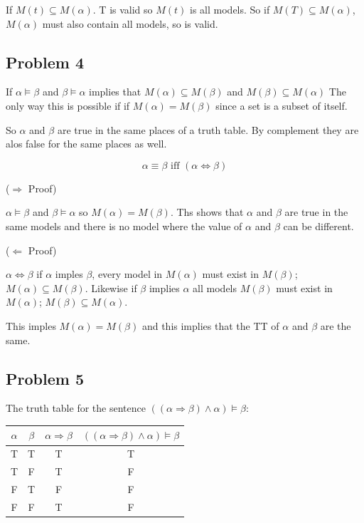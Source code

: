 \documentclass{article}
\begin{document}
If $M(t) \subseteq M( \alpha )$. T is valid so $M(t)$ is all models. So if $M(T) \subseteq M( \alpha )$, $M( \alpha )$ must also contain all models, so is valid.

\subsection{Problem 4}

If $ \alpha  \models  \beta $ and $ \beta  \models  \alpha $ implies that $M( \alpha ) \subseteq M( \beta )$ and $M( \beta ) \subseteq M( \alpha )$ The only way this is possible if if $M( \alpha )=M( \beta )$ since a set is a subset of itself.

So $ \alpha $ and $ \beta $ are true in the same places of a truth table. By complement they are alos false for the same places as well.

\[
 \alpha  \equiv  \beta  \text{ iff } ( \alpha  \Leftrightarrow  \beta )
\]

($\Rightarrow$ Proof)

$ \alpha  \models  \beta $ and $ \beta  \models  \alpha $ so $M( \alpha )=M( \beta )$. Ths shows that $ \alpha $ and $ \beta $ are true in the same models and there is no model where the value of $ \alpha $ and $ \beta $ can be different.

($\Leftarrow$ Proof)

$ \alpha  \Leftrightarrow  \beta $ if $ \alpha $ imples $ \beta $, every model in $M( \alpha )$ must exist in $M( \beta )$; $M( \alpha ) \subseteq M( \beta )$. Likewise if $ \beta $ implies $ \alpha $ all models $M( \beta )$ must exist in $M( \alpha )$; $M( \beta ) \subseteq M( \alpha )$.

This imples $M( \alpha )=M( \beta )$ and this implies that the TT of $ \alpha $ and $ \beta $ are the same.

\subsection{Problem 5}

The truth table for the sentence $(( \alpha  \Rightarrow  \beta ) \wedge  \alpha ) \models  \beta $:

\begin{tabular}{ | c | c | c | c | }

\hline
{\bf $ \alpha $} & {\bf $ \beta $} & {\bf $ \alpha  \Rightarrow  \beta $} & {\bf $(( \alpha  \Rightarrow  \beta ) \wedge  \alpha ) \models  \beta $} \\
\hline
T & T & T & T \\
\hline
T & F & T & F \\
\hline
F & T & F & F \\
\hline
F & F & T & F\\
\hline
\end{tabular}
\end{document}
